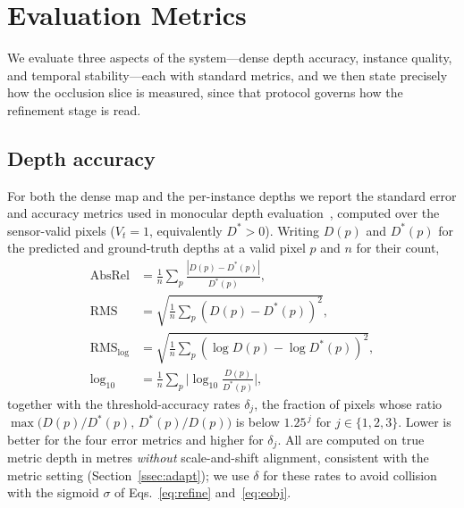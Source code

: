 \documentclass[sigconf, review=true]{acmart}
\newcommand{\absrel}{\mathrm{AbsRel}}
\begin{document}
\section{Evaluation Metrics}
\label{sec:metrics}
We evaluate three aspects of the system---dense depth accuracy, instance
quality, and temporal stability---each with standard metrics, and we then state
precisely how the occlusion slice is measured, since that protocol governs how
the refinement stage is read.

\subsection{Depth accuracy}
For both the dense map and the per-instance depths we report the standard
error and accuracy metrics used in monocular depth
evaluation~\cite{eigen2014silog}, computed over the sensor-valid pixels
($V_t{=}1$, equivalently $D^{*}>0$). Writing $D(p)$ and $D^{*}(p)$ for the
predicted and ground-truth depths at a valid pixel $p$ and $n$ for their count,
\begin{align*}
\absrel &= \tfrac1n\sum_p \frac{|D(p)-D^{*}(p)|}{D^{*}(p)}, \\
\mathrm{RMS} &= \sqrt{\tfrac1n\sum_p (D(p)-D^{*}(p))^2}, \\
\mathrm{RMS}_{\log} &= \sqrt{\tfrac1n\sum_p(\log D(p)-\log D^{*}(p))^2}, \\
\log_{10} &= \tfrac1n\sum_p\big|\log_{10}\tfrac{D(p)}{D^{*}(p)}\big| ,
\end{align*}
together with the threshold-accuracy rates $\delta_j$, the fraction of pixels
whose ratio $\max\!\big(D(p)/D^{*}(p),\,D^{*}(p)/D(p)\big)$ is below $1.25^{\,j}$
for $j\in\{1,2,3\}$. Lower is better for the four error metrics and higher for
$\delta_j$. All are computed on true metric depth in metres \emph{without}
scale-and-shift alignment, consistent with the metric setting
(Section~\ref{ssec:adapt}); we use $\delta$ for these rates to avoid collision
with the sigmoid $\sigma$ of Eqs.~\eqref{eq:refine} and~\eqref{eq:eobj}.
\end{document}
